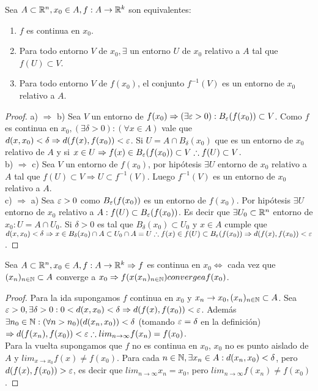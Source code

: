 \begin{prop}
  Sea $A \subset \mathbb{R}^n, x_0 \in A, f: A \to \mathbb{R}^k$ son equivalentes:
  \begin{enumerate}
    \item $f$ es continua en $x_0$.
    \item Para todo entorno $V$ de $x_0, \exists$ un entorno $U$ de $x_0$ relativo a $A$ tal que $f(U) \subset V$.
    \item Para todo entorno $V$ de $f(x_0)$, el conjunto $f^{-1}(V)$ es un entorno de $x_0$ relativo a $A$.
  \end{enumerate}

  \begin{proof}
    a) $\Rightarrow$ b) Sea $V$ un entorno de $f(x_0) \Rightarrow (\exists \varepsilon > 0) : B_{\varepsilon}(f(x_0)) \subset V$. Como $f$ es continua en $x_0, (\exists \delta > 0) : (\forall x \in A)$ vale que $d(x, x_0) < \delta \Rightarrow d(f(x), f(x_0)) < \varepsilon$. Si $U = A \cap B_{\delta}(x_0)$ que es un entorno de $x_0$ relativo de $A$ y si $x \in U \Rightarrow f(x) \in B_{\varepsilon}(f(x_0)) \subset V \therefore f(U) \subset V$. \\
    b) $\Rightarrow$ c) Sea $V$ un entorno de $f(x_0)$, por hipótesis $\exists U$ entorno de $x_0$ relativo a $A$ tal que $f(U) \subset V \Rightarrow U \subset f^{-1}(V)$. Luego $f^{-1}(V)$ es un entorno de $x_0$ relativo a $A$. \\
    c) $\Rightarrow$ a) Sea $\varepsilon > 0$ como $B_{\varepsilon}(f(x_0))$ es un entorno de $f(x_0)$. Por hipótesis $\exists U$ entorno de $x_0$ relativo a $A : f(U) \subset B_{\varepsilon}(f(x_0))$. Es decir que $\exists U_0 \subset \mathbb{R}^n$ entorno de $x_0 : U = A \cap U_0$. Si $\delta > 0$ es tal que $B_{\delta}(x_0) \subset U_0$ y $x \in A$ cumple que $d(x, x_0) < \delta \Rightarrow x \in B_{\delta}(x_0) \cap A \subset U_0 \cap A = U \therefore f(x) \in f(U) \subset B_{\varepsilon}(f(x_0))  \Rightarrow d(f(x), f(x_0)) < \varepsilon$.
  \end{proof}
\end{prop}

\begin{prop}
  Sea $A \subset \mathbb{R}^n, x_0 \in A, f: A \to \mathbb{R}^k \Rightarrow f$ es continua en $x_0 \iff$ cada vez que $(x_n)_{n \in \mathbb{N}} \subset A$ converge a $x_0 \Rightarrow f(x(x_n)_{n \in \mathbb{N}}) converge a f(x_0)$.
  \begin{proof}
    Para la ida supongamos $f$ continua en $x_0$ y $x_n \to x_0, (x_n)_{n \in \mathbb{N}} \subset A$. Sea $\varepsilon > 0, \exists \delta > 0 : 0 < d(x, x_0) < \delta \Rightarrow d(f(x), f(x_0)) < \varepsilon$. Además $\exists n_0 \in \mathbb{N} : (\forall n > n_0)(d(x_n, x_0)) < \delta$ (tomando $\varepsilon = \delta$ en la definición) $\Rightarrow d(f(x_n), f(x_0)) < \varepsilon \therefore lim_{n \to \infty} f(x_n) = f(x_0)$. \\

    Para la vuelta supongamos que $f$ no es continua en $x_0$, $x_0$ no es punto aislado de $A$ y $lim_{x \to x_0} f(x) \neq f(x_0)$. Para cada $n \in \mathbb{N}, \exists x_n \in A : d(x_n, x_0) < \delta$, pero $d(f(x), f(x_0)) > \varepsilon$, es decir que $lim_{n \to \infty} x_n = x_0$, pero $lim_{n \to \infty} f(x_n) \neq f(x_0)$.
  \end{proof}
\end{prop}

